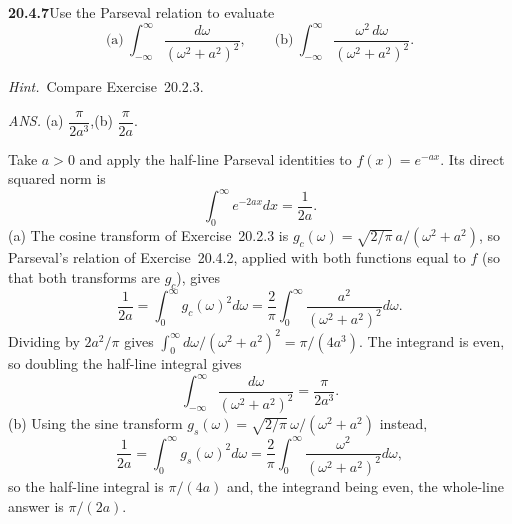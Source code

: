 \par\bigskip
\noindent\textbf{20.4.7}\quad Use the Parseval relation to
evaluate
\[
\text{(a)}\ \int_{-\infty}^{\infty}
\frac{d\omega}{(\omega^{2}+a^{2})^{2}},
\qquad
\text{(b)}\ \int_{-\infty}^{\infty}
\frac{\omega^{2}\,d\omega}{(\omega^{2}+a^{2})^{2}}.
\]
\par\emph{Hint.}~Compare Exercise~20.2.3.
\par\nobreak\hfill\emph{ANS.}\enspace
(a) $\dfrac{\pi}{2a^{3}}$,\quad(b) $\dfrac{\pi}{2a}$.
\par{}
\solution
Take $a>0$ and apply the half-line Parseval identities
to $f(x)=e^{-ax}$. Its direct squared norm is
\[
\int_0^\infty e^{-2ax}dx=\frac1{2a}.
\]
(a) The cosine transform of Exercise~20.2.3 is
$g_c(\omega)=\sqrt{2/\pi}\,a/(\omega^2+a^2)$, so Parseval's
relation of Exercise~20.4.2, applied with both functions equal to
$f$ (so that both transforms are $g_c$), gives
\[
\frac1{2a}=\int_0^\infty g_c(\omega)^2d\omega
=\frac2\pi\int_0^\infty
\frac{a^2}{(\omega^2+a^2)^2}d\omega.
\]
Dividing by $2a^2/\pi$ gives
$\int_0^\infty d\omega/(\omega^2+a^2)^2=\pi/(4a^3)$. The
integrand is even, so doubling the half-line integral gives
\[
\boxed{\int_{-\infty}^{\infty}\frac{d\omega}{(\omega^2+a^2)^2}
=\frac\pi{2a^3}}.
\]
(b) Using the sine transform
$g_s(\omega)=\sqrt{2/\pi}\,\omega/(\omega^2+a^2)$ instead,
\[
\frac1{2a}=\int_0^\infty g_s(\omega)^2d\omega
=\frac2\pi\int_0^\infty
\frac{\omega^2}{(\omega^2+a^2)^2}d\omega,
\]
so the half-line integral is $\pi/(4a)$ and, the integrand being
even, the whole-line answer is $\boxed{\pi/(2a)}$.

